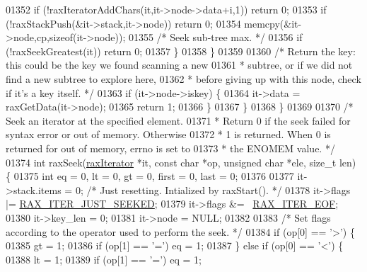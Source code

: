 \begin{DoxyCode}
{{{{{{{{{{{{{{{{{{{{01352                 \textcolor{keywordflow}{if} (!raxIteratorAddChars(it,it->node->data+i,1)) \textcolor{keywordflow}{return} 0;
01353                 \textcolor{keywordflow}{if} (!raxStackPush(&it->stack,it->node)) \textcolor{keywordflow}{return} 0;
01354                 memcpy(&it->node,cp,\textcolor{keyword}{sizeof}(it->node));
01355                 \textcolor{comment}{/* Seek sub-tree max. */}
01356                 \textcolor{keywordflow}{if} (!raxSeekGreatest(it)) \textcolor{keywordflow}{return} 0;
01357             \}
01358         \}
01359 
01360         \textcolor{comment}{/* Return the key: this could be the key we found scanning a new}
01361 \textcolor{comment}{         * subtree, or if we did not find a new subtree to explore here,}
01362 \textcolor{comment}{         * before giving up with this node, check if it's a key itself. */}
01363         \textcolor{keywordflow}{if} (it->node->iskey) \{
01364             it->data = raxGetData(it->node);
01365             \textcolor{keywordflow}{return} 1;
01366         \}
01367     \}
01368 \}
01369 
01370 \textcolor{comment}{/* Seek an iterator at the specified element.}
01371 \textcolor{comment}{ * Return 0 if the seek failed for syntax error or out of memory. Otherwise}
01372 \textcolor{comment}{ * 1 is returned. When 0 is returned for out of memory, errno is set to}
01373 \textcolor{comment}{ * the ENOMEM value. */}
01374 \textcolor{keywordtype}{int} raxSeek(\hyperlink{structraxIterator}{raxIterator} *it, \textcolor{keyword}{const} \textcolor{keywordtype}{char} *op, \textcolor{keywordtype}{unsigned} \textcolor{keywordtype}{char} *ele, size\_t len) \{
01375     \textcolor{keywordtype}{int} eq = 0, lt = 0, gt = 0, first = 0, last = 0;
01376 
01377     it->stack.items = 0; \textcolor{comment}{/* Just resetting. Intialized by raxStart(). */}
01378     it->flags |= \hyperlink{rax_8h_a665a029bbb4c6864ca2153b3ba3b746c}{RAX\_ITER\_JUST\_SEEKED};
01379     it->flags &= ~\hyperlink{rax_8h_a4fb08a914b84ba0a39daa86297176e1c}{RAX\_ITER\_EOF};
01380     it->key\_len = 0;
01381     it->node = NULL;
01382 
01383     \textcolor{comment}{/* Set flags according to the operator used to perform the seek. */}
01384     \textcolor{keywordflow}{if} (op[0] == \textcolor{stringliteral}{'>'}) \{
01385         gt = 1;
01386         \textcolor{keywordflow}{if} (op[1] == \textcolor{stringliteral}{'='}) eq = 1;
01387     \} \textcolor{keywordflow}{else} \textcolor{keywordflow}{if} (op[0] == \textcolor{stringliteral}{'<'}) \{
01388         lt = 1;
01389         \textcolor{keywordflow}{if} (op[1] == \textcolor{stringliteral}{'='}) eq = 1;
}}}}}}}}}}}}}}}}}}}}
\end{DoxyCode}
